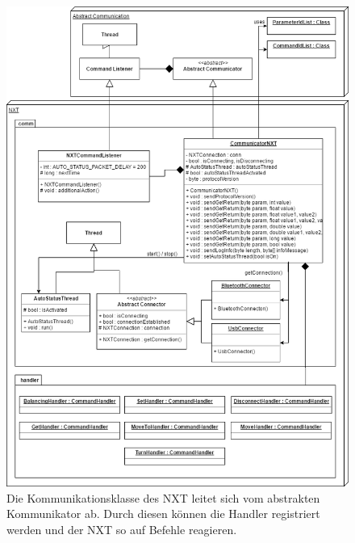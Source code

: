 \documentclass[oneside,abstractoff,a4paper]{scrartcl}
\begin{document}
\begin{figure}
	\includegraphics[width=\textwidth,height=0.9\textheight,keepaspectratio]{CommunicatorNXT.png}
    \caption{Die Kommunikationsklasse des NXT leitet sich vom abstrakten Kommunikator ab. Durch diesen können die Handler registriert werden und der NXT so auf Befehle reagieren.  }
    \label{fig:CommNXT}
\end{figure}
\end{document}
